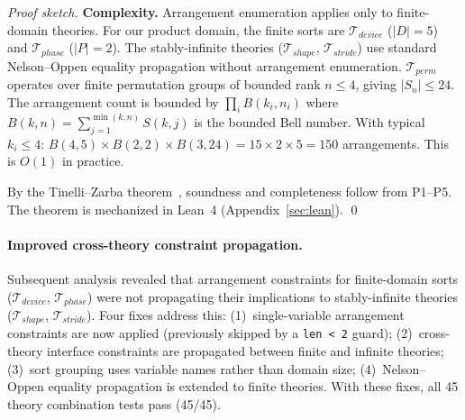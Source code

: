 \documentclass[11pt]{article}
\begin{document}
\begin{proof}[Proof sketch]
\noindent\textbf{Complexity.}
Arrangement enumeration applies only to finite-domain theories.
For our product domain, the finite sorts are
$\mathcal{T}_{\mathit{device}}$ ($|D| = 5$) and $\mathcal{T}_{\mathit{phase}}$ ($|P| = 2$).
The stably-infinite theories ($\mathcal{T}_{\mathit{shape}}$, $\mathcal{T}_{\mathit{stride}}$)
use standard Nelson--Oppen equality propagation without arrangement enumeration.
$\mathcal{T}_{\mathit{perm}}$ operates over finite permutation groups of bounded rank
$n \leq 4$, giving $|S_n| \leq 24$.
The arrangement count is bounded by
$\prod_i B(k_i, n_i)$ where $B(k, n) = \sum_{j=1}^{\min(k,n)} S(k, j)$
is the bounded Bell number.
With typical $k_i \leq 4$:
$B(4,5) \times B(2,2) \times B(3,24) = 15 \times 2 \times 5 = 150$ arrangements.
This is $O(1)$ in practice.

By the Tinelli--Zarba theorem~\cite{tinelli03}, soundness and completeness
follow from P1--P5.  The theorem is mechanized in Lean~4
(Appendix~\ref{sec:lean}). \qed
\end{proof}

\paragraph{Improved cross-theory constraint propagation.}
Subsequent analysis revealed that arrangement constraints for
finite-domain sorts ($\mathcal{T}_{\mathit{device}}$,
$\mathcal{T}_{\mathit{phase}}$) were not propagating their
implications to stably-infinite theories
($\mathcal{T}_{\mathit{shape}}$, $\mathcal{T}_{\mathit{stride}}$).
Four fixes address this:
(1)~single-variable arrangement constraints are now applied
(previously skipped by a \texttt{len < 2} guard);
(2)~cross-theory interface constraints are propagated between
finite and infinite theories;
(3)~sort grouping uses variable names rather than domain size;
(4)~Nelson--Oppen equality propagation is extended to finite theories.
With these fixes, all 45 theory combination tests pass (45/45).
\end{document}
